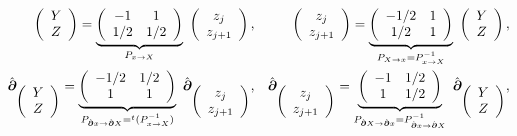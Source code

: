 {\color{blue}

\begin{eqnarray*}
	\left ( \begin{array}{c} Y \\ Z \end{array} \right ) = \underbrace{\left ( \begin{array}{cc} -1 & 1  \\ 1/2  &  1/2 \end{array} \right )}_{P_{x \to X} }  \left ( \begin{array}{c} z_j \\ z_{j+1} \end{array} \right ), & & \left ( \begin{array}{c} z_j \\ z_{j+1} \end{array} \right ) = \underbrace{\left ( \begin{array}{cc} -1/2 & 1  \\ 1/2  &  1 \end{array} \right )}_{P_{X \to x} = P_{x \to X}^{-1} }  \left ( \begin{array}{c} Y \\ Z \end{array} \right ),\\
	\operator{\partial}_{\left ( \begin{array}{c} Y \\ Z \end{array} \right )} = \underbrace{\left ( \begin{array}{cc} -1/2 & 1/2  \\ 1  &  1 \end{array} \right )}_{P_{\operator{\partial}x \to \operator{\partial}X} =  {}^t(P_{x \to X}^{-1}) } \operator{\partial}_{  \left ( \begin{array}{c} z_j \\ z_{j+1} \end{array} \right )}, & & \operator{\partial}_{\left ( \begin{array}{c} z_j \\ z_{j+1} \end{array} \right )} = \underbrace{\left ( \begin{array}{cc} -1 & 1/2  \\ 1  &  1/2 \end{array} \right )}_{P_{\operator{\partial}X \to \operator{\partial}x} = P_{\operator{\partial}x \to \operator{\partial}X}^{-1} }  \operator{\partial}_{\left ( \begin{array}{c} Y \\ Z \end{array} \right )},
\end{eqnarray*}


}

